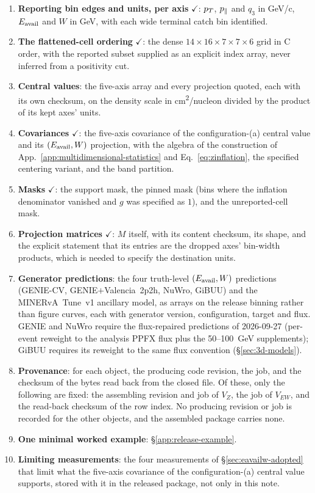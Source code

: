 \begin{enumerate}[itemsep=2pt]
  \item \textbf{Reporting bin edges and units, per axis} $\checkmark$: $p_{T}$, $p_{\parallel}$ and $q_{3}$ in \si{GeV/c}, $E_{\mathrm{avail}}$ and $W$ in \si{GeV}, with each wide terminal catch bin identified.
  \item \textbf{The flattened-cell ordering} $\checkmark$: the dense $14\times16\times7\times7\times6$ grid in C order, with the reported subset supplied as an explicit index array, never inferred from a positivity cut.
  \item \textbf{Central values}: the five-axis array and every projection quoted, each with its own checksum, on the density scale in \si{cm^2/nucleon} divided by the product of its kept axes' units.
  \item \textbf{Covariances} $\checkmark$: the five-axis covariance of the configuration-(a) central value and its $(E_{\mathrm{avail}},W)$ projection, with the algebra of the construction of App.~\ref{app:multidimensional-statistics} and Eq.~\eqref{eq:zinflation}, the specified centering variant, and the band partition.
  \item \textbf{Masks} $\checkmark$: the support mask, the pinned mask (bins where the inflation denominator vanished and $g$ was specified as $1$), and the unreported-cell mask.
  \item \textbf{Projection matrices} $\checkmark$: $M$ itself, with its content checksum, its shape, and the explicit statement that its entries are the dropped axes' bin-width products, which is needed to specify the destination units.
  \item \textbf{Generator predictions}: the four truth-level $(E_{\mathrm{avail}},W)$ predictions (GENIE-CV, GENIE$+$Valencia~2p2h, NuWro, GiBUU) and the MINERvA~Tune~v1 ancillary model, as arrays on the release binning rather than figure curves, each with generator version, configuration, target and flux. GENIE and NuWro require the flux-repaired predictions of 2026-09-27 (per-event reweight to the analysis PPFX flux plus the 50--\SI{100}{GeV} supplements); GiBUU requires its reweight to the same flux convention (\S\ref{sec:3d-models}).
  \item \textbf{Provenance}: for each object, the producing code revision, the job, and the checksum of the bytes read back from the closed file. Of these, only the following are fixed: the assembling revision and job of $V_Z$, the job of $V_{EW}$, and the read-back checksum of the row index. No producing revision or job is recorded for the other objects, and the assembled package carries none.
  \item \textbf{One minimal worked example}: \S\ref{app:release-example}.
  \item \textbf{Limiting measurements}: the four measurements of \S\ref{sec:eavailw-adopted} that limit what the five-axis covariance of the configuration-(a) central value supports, stored with it in the released package, not only in this note.
\end{enumerate}

